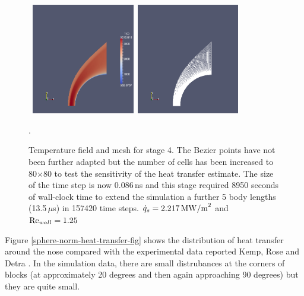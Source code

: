 \begin{figure}[htbp]
\begin{center}
\mbox{
\includegraphics[width=0.4\textwidth]{../2D/sphere-heat-transfer/sphere4-T-field.png}
\includegraphics[width=0.4\textwidth]{../2D/sphere-heat-transfer/sphere4-mesh.png}
}
\end{center}
\caption{Temperature field and mesh for stage 4.
  The Bezier points have not been further adapted but the number of cells has been
  increased to 80$\times$80 to test the sensitivity of the heat transfer estimate.
  The size of the time step is now 0.086\,ns and this stage required 8950 seconds of wall-clock time
  to extend the simulation a further 5 body lengths (13.5\,$\mu$s) in 157420 time steps.
  $\dot{q}_s =2 .217\,{\rm MW/m}^2$ and ${\rm Re}_{wall} = 1.25$}.
\label{sphere-heat-transfer-stage-4-fig}
\end{figure}

Figure \ref{sphere-norm-heat-transfer-fig} shows the distribution of heat transfer around the nose
compared with the experimental data reported Kemp, Rose and Detra \cite{kemp_etal_1959}.
In the simulation data, there are small distrubances at the corners of blocks 
(at approximately 20 degrees and then again approaching 90 degrees) but they are quite small.

